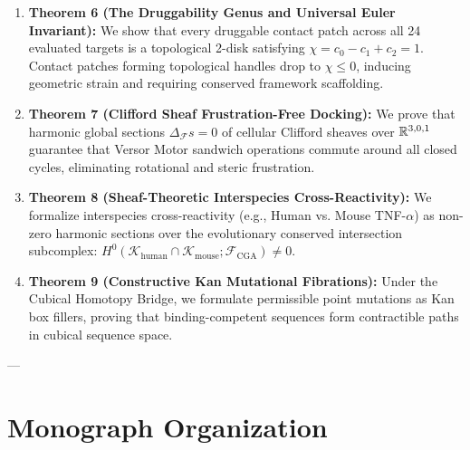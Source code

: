 \begin{enumerate}[leftmargin=1.2cm]
    \item \textbf{Theorem 6 (The Druggability Genus and Universal Euler Invariant):}  
    We show that every druggable contact patch across all 24 evaluated targets is a topological 2-disk satisfying $\chi = c_0 - c_1 + c_2 = 1$. Contact patches forming topological handles drop to $\chi \le 0$, inducing geometric strain and requiring conserved framework scaffolding.

    \item \textbf{Theorem 7 (Clifford Sheaf Frustration-Free Docking):}  
    We prove that harmonic global sections $\Delta_{\mathcal{F}} s = 0$ of cellular Clifford sheaves over $\mathbb{R}^{3,0,1}$ guarantee that Versor Motor sandwich operations commute around all closed cycles, eliminating rotational and steric frustration.

    \item \textbf{Theorem 8 (Sheaf-Theoretic Interspecies Cross-Reactivity):}  
    We formalize interspecies cross-reactivity (e.g., Human vs. Mouse TNF-$\alpha$) as non-zero harmonic sections over the evolutionary conserved intersection subcomplex: $H^0(\mathcal{K}_{\text{human}} \cap \mathcal{K}_{\text{mouse}}; \mathcal{F}_{\text{CGA}}) \ne 0$.

    \item \textbf{Theorem 9 (Constructive Kan Mutational Fibrations):}  
    Under the Cubical Homotopy Bridge, we formulate permissible point mutations as Kan box fillers, proving that binding-competent sequences form contractible paths in cubical sequence space.
\end{enumerate}

---

\section{Monograph Organization}
\label{sec:monograph_org}

